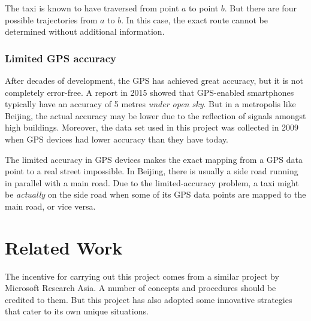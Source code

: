 The taxi is known to have traversed from point $a$ to point $b$. But there are four possible trajectories from $a$ to $b$. In this case, the exact route cannot be determined without additional information.

\subsubsection{Limited GPS accuracy}
After decades of development, the GPS has achieved great accuracy, but it is not completely error-free. A report \cite{FP15} in 2015 showed that GPS-enabled smartphones typically have an accuracy of 5 metres \emph{under open sky}. But in a metropolis like Beijing, the actual accuracy may be lower due to the reflection of signals amongst high buildings. Moreover, the data set used in this project was collected in 2009 when GPS devices had lower accuracy than they have today.

The limited accuracy in GPS devices makes the exact mapping from a GPS data point to a real street impossible. In Beijing, there is usually a side road running in parallel with a main road. Due to the limited-accuracy problem, a taxi might be \emph{actually} on the side road when some of its GPS data points are mapped to the main road, or vice versa. 

\section{Related Work}
The incentive for carrying out this project comes from a similar project \cite{TDR10} by Microsoft Research Asia. A number of concepts and procedures should be credited to them. But this project has also adopted some innovative strategies that cater to its own unique situations. 